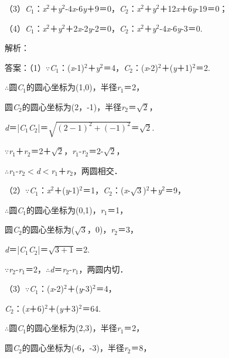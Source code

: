 \documentclass{article} %
\begin{document}
（3）\textit{C}${}_{1}$：\textit{x}${}^{2}$＋\textit{y}${}^{2}$-4\textit{x}-6\textit{y}＋9＝0，\textit{C}${}_{2}$：\textit{x}${}^{2}$＋\textit{y}${}^{2}$＋12\textit{x}＋6\textit{y}-19＝0；

（4）\textit{C}${}_{1}$：\textit{x}${}^{2}$＋\textit{y}${}^{2}$＋2\textit{x}-2\textit{y}-2＝0，\textit{C}${}_{2}$：\textit{x}${}^{2}$＋\textit{y}${}^{2}$-4\textit{x}-6\textit{y}-3＝0.

解析：

答案：（1）$\mathrm{\because}$\textit{C}${}_{1}$：(\textit{x}-1)${}^{2}$＋\textit{y}${}^{2}$＝4，\textit{C}${}_{2}$：(\textit{x}-2)${}^{2}$＋(\textit{y}＋1)${}^{2}$＝2.

$\mathrm{\therefore}$圆\textit{C}${}_{1}$的圆心坐标为(1,0)，半径\textit{r}${}_{1}$＝2，

圆\textit{C}${}_{2}$的圆心坐标为(2，-1)，半径\textit{r}${}_{2}$＝$\sqrt{2}$，

\textit{d}＝|\textit{C}${}_{1}$\textit{C}${}_{2}$|＝$\sqrt{(2-1)^2+(-1)^2}$＝$\sqrt{2}$.

$\mathrm{\because}$\textit{r}${}_{1}$＋\textit{r}${}_{2}$＝2＋$\sqrt{2}$，\textit{r}${}_{1}$-\textit{r}${}_{2}$＝2-$\sqrt{2}$，

$\mathrm{\therefore}$\textit{r}${}_{1}$-\textit{r}${}_{2}$$\mathrm{<}$\textit{d}$\mathrm{<}$\textit{r}${}_{1}$＋\textit{r}${}_{2}$，两圆相交．

（2）$\mathrm{\because}$\textit{C}${}_{1}$：\textit{x}${}^{2}$＋(\textit{y}-1)${}^{2}$＝1，\textit{C}${}_{2}$：(\textit{x}-$\sqrt{3}$)${}^{2}$＋\textit{y}${}^{2}$＝9，

$\mathrm{\therefore}$圆\textit{C}${}_{1}$的圆心坐标为(0,1)，\textit{r}${}_{1}$＝1，

圆\textit{C}${}_{2}$的圆心坐标为($\sqrt{3}$，0)，\textit{r}${}_{2}$＝3，

\textit{d}＝|\textit{C}${}_{1}$\textit{C}${}_{2}$|＝$\sqrt{3+1}$＝2.

$\mathrm{\because}$\textit{r}${}_{2}$-\textit{r}${}_{1}$＝2，$\mathrm{\therefore}$\textit{d}＝\textit{r}${}_{2}$-\textit{r}${}_{1}$，两圆内切．

（3）$\mathrm{\because}$\textit{C}${}_{1}$：(\textit{x}-2)${}^{2}$＋(\textit{y}-3)${}^{2}$＝4，

\textit{C}${}_{2}$：(\textit{x}＋6)${}^{2}$＋(\textit{y}＋3)${}^{2}$＝64.

$\mathrm{\therefore}$圆\textit{C}${}_{1}$的圆心坐标为(2,3)，半径\textit{r}${}_{1}$＝2，

圆\textit{C}${}_{2}$的圆心坐标为(-6，-3)，半径\textit{r}${}_{2}$＝8，
\end{document}
